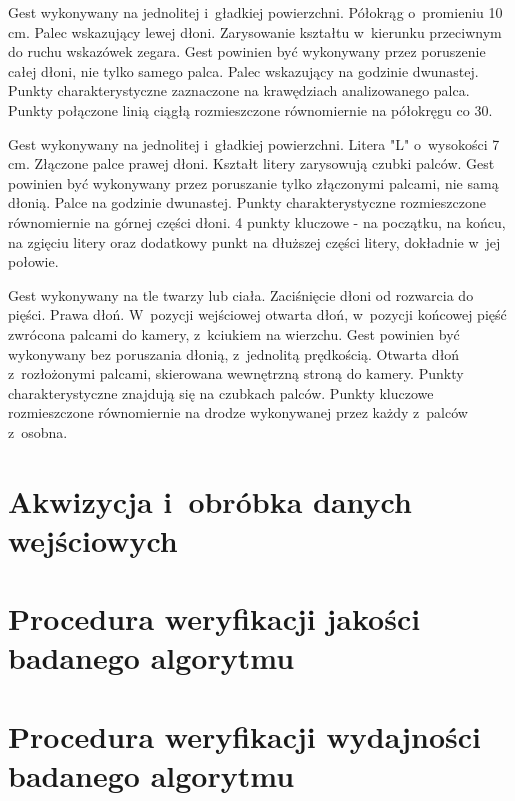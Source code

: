     \newpage
         {Gest wykonywany na jednolitej i~gładkiej powierzchni.}
         {Półokrąg o~promieniu 10 cm.}
         {Palec wskazujący lewej dłoni.}
         {Zarysowanie kształtu w~kierunku przeciwnym do ruchu wskazówek zegara.}
         {Gest powinien być wykonywany przez poruszenie całej dłoni, nie tylko samego palca.}
         {Palec wskazujący na godzinie dwunastej.}
         {Punkty charakterystyczne zaznaczone na krawędziach analizowanego palca.}
         {Punkty połączone linią ciągłą rozmieszczone równomiernie na półokręgu co 30\degree.}

         {Gest wykonywany na jednolitej i~gładkiej powierzchni.}
         {Litera "L" o~wysokości 7 cm.}
         {Złączone palce prawej dłoni.}
         {Kształt litery zarysowują czubki palców.}
         {Gest powinien być wykonywany przez poruszanie tylko złączonymi palcami, nie samą dłonią.}
         {Palce na godzinie dwunastej.}
         {Punkty charakterystyczne rozmieszczone równomiernie na górnej części dłoni.}
         {4 punkty kluczowe - na początku, na końcu, na zgięciu litery oraz dodatkowy punkt na dłuższej części litery, dokładnie w~jej połowie.}

    \newpage
         {Gest wykonywany na tle twarzy lub ciała.}
         {Zaciśnięcie dłoni od rozwarcia do pięści.}
         {Prawa dłoń.}
         {W~pozycji wejściowej otwarta dłoń, w~pozycji końcowej pięść zwrócona palcami do kamery, z~kciukiem na wierzchu.}
         {Gest powinien być wykonywany bez poruszania dłonią, z~jednolitą prędkością.}
         {Otwarta dłoń z~rozłożonymi palcami, skierowana wewnętrzną stroną do kamery.}
         {Punkty charakterystyczne znajdują się na czubkach palców.}
         {Punkty kluczowe rozmieszczone równomiernie na drodze wykonywanej przez każdy z~palców z~osobna.}

  \section{Akwizycja i~obróbka danych wejściowych}\label{Section_DefinicjeGestow}

  \section{Procedura weryfikacji jakości badanego algorytmu}\label{Section_Jakosc}

  \section{Procedura weryfikacji wydajności badanego algorytmu}\label{Section_Wydajnosc}


